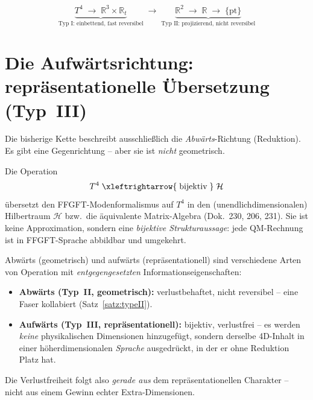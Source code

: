 \[
\underbrace{T^4 \;\longrightarrow\; \mathbb{R}^3\times\mathbb{R}_t}_{\text{Typ I: einbettend, fast reversibel}}
\;\longrightarrow\;
\underbrace{\mathbb{R}^2 \;\longrightarrow\; \mathbb{R} \;\longrightarrow\; \{\mathrm{pt}\}}_{\text{Typ II: projizierend, nicht reversibel}}
\]

\section{Die Aufw\"artsrichtung: repr\"asentationelle \"Ubersetzung (Typ~III)}

Die bisherige Kette beschreibt ausschlie\ss lich die \emph{Abw\"arts}-Richtung
(Reduktion). Es gibt eine Gegenrichtung -- aber sie ist \emph{nicht} geometrisch.

\begin{definition}\label{def:typeIII}
Die Operation
\[
  T^4 \;\xleftrightarrow{\;\text{bijektiv}\;}\; \mathcal{H}
\]
\"ubersetzt den FFGFT-Modenformalismus auf $T^4$ in den (unendlich\-dimensionalen)
Hilbertraum $\mathcal{H}$ bzw.\ die \"aquivalente Matrix-Algebra (Dok.~230, 206,
231). Sie ist keine Approximation, sondern eine \emph{bijektive
Strukturaussage}: jede QM-Rechnung ist in FFGFT-Sprache abbildbar und umgekehrt.
\end{definition}

\begin{important}
Abw\"arts (geometrisch) und aufw\"arts (repr\"asentationell) sind verschiedene
Arten von Operation mit \emph{entgegengesetzten} Informationseigenschaften:
\begin{itemize}
  \item \textbf{Abw\"arts (Typ~II, geometrisch):} verlustbehaftet, nicht
  reversibel -- eine Faser kollabiert (Satz~\ref{satz:typeII}).
  \item \textbf{Aufw\"arts (Typ~III, repr\"asentationell):} bijektiv,
  verlustfrei -- es werden \emph{keine} physikalischen Dimensionen hinzugef\"ugt,
  sondern derselbe 4D-Inhalt in einer h\"oherdimensionalen \emph{Sprache}
  ausgedr\"uckt, in der er ohne Reduktion Platz hat.
\end{itemize}
Die Verlustfreiheit folgt also \emph{gerade aus} dem repr\"asentationellen
Charakter -- nicht aus einem Gewinn echter Extra-Dimensionen.
\end{important}

